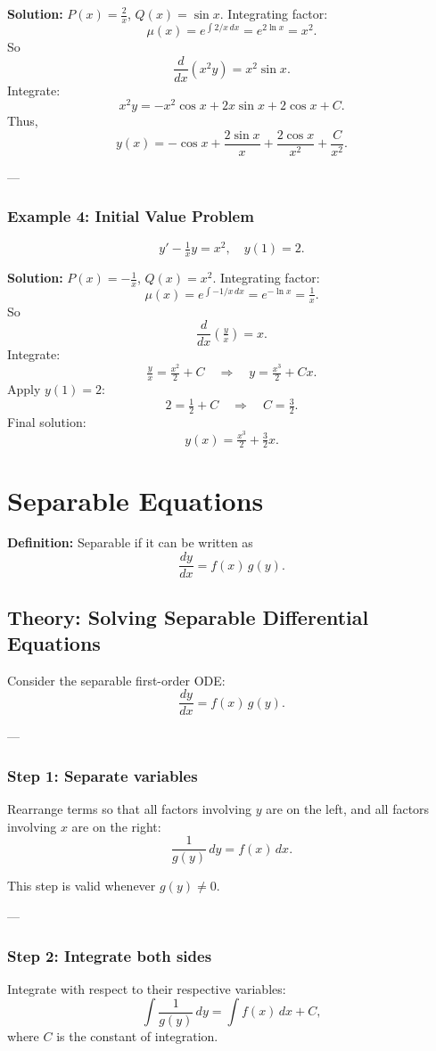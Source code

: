 \documentclass[12pt]{book}
\begin{document}
\textbf{Solution:} $P(x) = \tfrac{2}{x}$, $Q(x)=\sin x$.  
Integrating factor:
\[
\mu(x) = e^{\int 2/x \, dx} = e^{2\ln x} = x^2.
\]
So
\[
\frac{d}{dx}(x^2 y) = x^2 \sin x.
\]
Integrate:
\[
x^2 y = -x^2 \cos x + 2x \sin x + 2\cos x + C.
\]
Thus,
\[
y(x) = -\cos x + \frac{2\sin x}{x} + \frac{2\cos x}{x^2} + \frac{C}{x^2}.
\]

---

\subsection*{Example 4: Initial Value Problem}
\[
y' - \tfrac{1}{x}y = x^2, \quad y(1) = 2.
\]

\textbf{Solution:} $P(x)=-\tfrac{1}{x}$, $Q(x)=x^2$.  
Integrating factor:
\[
\mu(x) = e^{\int -1/x \, dx} = e^{-\ln x} = \tfrac{1}{x}.
\]
So
\[
\frac{d}{dx}\!\left(\tfrac{y}{x}\right) = x.
\]
Integrate:
\[
\tfrac{y}{x} = \tfrac{x^2}{2} + C \quad\Longrightarrow\quad y = \tfrac{x^3}{2} + Cx.
\]
Apply $y(1)=2$:
\[
2 = \tfrac{1}{2} + C \quad\Rightarrow\quad C = \tfrac{3}{2}.
\]
Final solution:
\[
y(x) = \tfrac{x^3}{2} + \tfrac{3}{2}x.
\]


\chapter{Separable Equations}
\textbf{Definition:} Separable if it can be written as
\[
\frac{dy}{dx} = f(x)\,g(y).
\]

\section*{Theory: Solving Separable Differential Equations}

Consider the separable first-order ODE:
\[
\frac{dy}{dx} = f(x)\,g(y). \tag{1}
\]

---

\subsection*{Step 1: Separate variables}
Rearrange terms so that all factors involving $y$ are on the left, and all factors involving $x$ are on the right:
\[
\frac{1}{g(y)}\,dy = f(x)\,dx. \tag{2}
\]

This step is valid whenever $g(y)\neq 0$.

---

\subsection*{Step 2: Integrate both sides}
Integrate with respect to their respective variables:
\[
\int \frac{1}{g(y)}\,dy = \int f(x)\,dx + C, \tag{3}
\]
where $C$ is the constant of integration.
\end{document}
